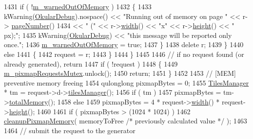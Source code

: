 \begin{DoxyCode}
1431             \textcolor{keywordflow}{if} ( !\hyperlink{classOkular_1_1DocumentPrivate_a0d88f3c05c3c5b7645c6a12fde948759}{m\_warnedOutOfMemory} )
1432             \{
1433                 kWarning(\hyperlink{debug__p_8h_af16c6e32a95969dd0605d792ec9807c7}{OkularDebug}).nospace() << \textcolor{stringliteral}{"Running out of memory on page "} << r->
      \hyperlink{classOkular_1_1PixmapRequest_a50f959175182137dbb9e2dbd6ddd71aa}{pageNumber}()
1434                     << \textcolor{stringliteral}{" ("} << r->\hyperlink{classOkular_1_1PixmapRequest_a3e82f09b91a52efed7435eeb9903e5fc}{width}() << \textcolor{stringliteral}{"x"} << r->\hyperlink{classOkular_1_1PixmapRequest_a782392a2efc6303994c7e0158c76ee06}{height}() << \textcolor{stringliteral}{" px);"};
1435                 kWarning(\hyperlink{debug__p_8h_af16c6e32a95969dd0605d792ec9807c7}{OkularDebug}) << \textcolor{stringliteral}{"this message will be reported only once."};
1436                 \hyperlink{classOkular_1_1DocumentPrivate_a0d88f3c05c3c5b7645c6a12fde948759}{m\_warnedOutOfMemory} = \textcolor{keyword}{true};
1437             \}
1438             \textcolor{keyword}{delete} r;
1439         \}
1440         \textcolor{keywordflow}{else}
1441         \{
1442             request = r;
1443         \}
1444     \}
1445 
1446     \textcolor{comment}{// if no request found (or already generated), return}
1447     \textcolor{keywordflow}{if} ( !request )
1448     \{
1449         \hyperlink{classOkular_1_1DocumentPrivate_a5c0e919d575a7a3c19a42c64a672fce4}{m\_pixmapRequestsMutex}.unlock();
1450         \textcolor{keywordflow}{return};
1451     \}
1452 
1453     \textcolor{comment}{// [MEM] preventive memory freeing}
1454     qulonglong pixmapBytes = 0;
1455     \hyperlink{classOkular_1_1TilesManager}{TilesManager} * tm = request->d->\hyperlink{classOkular_1_1PixmapRequestPrivate_a1765ff434c6bd718628d02bbca3cb271}{tilesManager}();
1456     \textcolor{keywordflow}{if} ( tm )
1457         pixmapBytes = tm->\hyperlink{classOkular_1_1TilesManager_a7baf6b1ce882f1fea1499fa956097c23}{totalMemory}();
1458     \textcolor{keywordflow}{else}
1459         pixmapBytes = 4 * request->\hyperlink{classOkular_1_1PixmapRequest_a3e82f09b91a52efed7435eeb9903e5fc}{width}() * request->\hyperlink{classOkular_1_1PixmapRequest_a782392a2efc6303994c7e0158c76ee06}{height}();
1460 
1461     \textcolor{keywordflow}{if} ( pixmapBytes > (1024 * 1024) )
1462         \hyperlink{classOkular_1_1DocumentPrivate_a8490b106f8f873de76b7ca6dcb1320f0}{cleanupPixmapMemory}( memoryToFree \textcolor{comment}{/* previously calculated value */} );
1463 
1464     \textcolor{comment}{// submit the request to the generator}

\end{DoxyCode}
